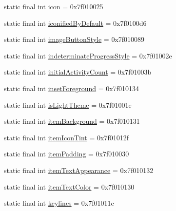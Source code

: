 \begin{CompactItemize}
\item 
static final int \hyperlink{classandroid_1_1support_1_1graphics_1_1drawable_1_1_r_1_1attr_a6d5e6570ceefe45c6a357dfd43c906f}{icon} = 0x7f010025
\item 
static final int \hyperlink{classandroid_1_1support_1_1graphics_1_1drawable_1_1_r_1_1attr_173e59b074787c4f61b24593026c58b3}{iconifiedByDefault} = 0x7f0100d6
\item 
static final int \hyperlink{classandroid_1_1support_1_1graphics_1_1drawable_1_1_r_1_1attr_38540dc343ec2e52fa13bc24f65e69d1}{imageButtonStyle} = 0x7f010089
\item 
static final int \hyperlink{classandroid_1_1support_1_1graphics_1_1drawable_1_1_r_1_1attr_4e694a00c1feb23683305b8c1c8de716}{indeterminateProgressStyle} = 0x7f01002e
\item 
static final int \hyperlink{classandroid_1_1support_1_1graphics_1_1drawable_1_1_r_1_1attr_4f0270b1d09030ee85afffb0d8b939e1}{initialActivityCount} = 0x7f01003b
\item 
static final int \hyperlink{classandroid_1_1support_1_1graphics_1_1drawable_1_1_r_1_1attr_d5fa5193bf8163d6cf78ad449d5c86b3}{insetForeground} = 0x7f010134
\item 
static final int \hyperlink{classandroid_1_1support_1_1graphics_1_1drawable_1_1_r_1_1attr_707e904839e4829119fbd7cf44372683}{isLightTheme} = 0x7f01001e
\item 
static final int \hyperlink{classandroid_1_1support_1_1graphics_1_1drawable_1_1_r_1_1attr_b7348c63abaadd05cfd3efecac6fa91f}{itemBackground} = 0x7f010131
\item 
static final int \hyperlink{classandroid_1_1support_1_1graphics_1_1drawable_1_1_r_1_1attr_84306507d408808fecae60362581b1e5}{itemIconTint} = 0x7f01012f
\item 
static final int \hyperlink{classandroid_1_1support_1_1graphics_1_1drawable_1_1_r_1_1attr_d1302b9e6807f4a537fc3a0a7736f9dd}{itemPadding} = 0x7f010030
\item 
static final int \hyperlink{classandroid_1_1support_1_1graphics_1_1drawable_1_1_r_1_1attr_c00b33ea39bce3b0da405549e3a0af3d}{itemTextAppearance} = 0x7f010132
\item 
static final int \hyperlink{classandroid_1_1support_1_1graphics_1_1drawable_1_1_r_1_1attr_4bc331851367acdd88d68e403fc93688}{itemTextColor} = 0x7f010130
\item 
static final int \hyperlink{classandroid_1_1support_1_1graphics_1_1drawable_1_1_r_1_1attr_c94b17abaadf41ef50a46552c92ae312}{keylines} = 0x7f01011c

\end{CompactItemize}
